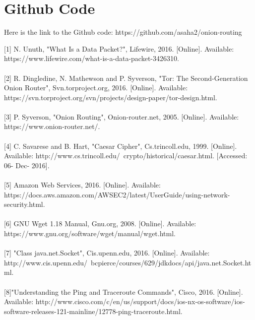 \documentclass{article}
\begin{document}
\section{Github Code}
Here is the link to the Github code:
https://github.com/asaha2/onion-routing

\newpage
\begin{thebibliography}{9}
%
%
[1] N. Unuth, "What Is a Data Packet?", Lifewire, 2016. [Online]. Available: https://www.lifewire.com/what-is-a-data-packet-3426310.\\
 \\

[2] R. Dingledine, N. Mathewson and P. Syverson, "Tor: The Second-Generation Onion Router", Svn.torproject.org, 2016. [Online]. Available: https://svn.torproject.org/svn/projects/design-paper/tor-design.html.\\
 \\

[3] P. Syverson, "Onion Routing", Onion-router.net, 2005. [Online]. Available: https://www.onion-router.net/.\\
 \\
 
[4] C. Savarese and B. Hart, "Caesar Cipher", Cs.trincoll.edu, 1999. [Online]. Available: http://www.cs.trincoll.edu/~crypto/historical/caesar.html. [Accessed: 06- Dec- 2016].\\
 \\
 
[5] Amazon Web Services, 2016. [Online]. Available:\\ https://docs.aws.amazon.com/AWSEC2/latest/UserGuide/using-network-security.html.\\
 \\
 
[6] GNU Wget 1.18 Manual, Gnu.org, 2008. [Online]. Available: https://www.gnu.org/software/wget/manual/wget.html. \\
 \\
 
[7] "Class java.net.Socket", Cis.upenn.edu, 2016. [Online]. Available: http://www.cis.upenn.edu/~bcpierce/courses/629/jdkdocs/api/java.net.Socket.html.\\
 \\
 
[8]"Understanding the Ping and Traceroute Commands", Cisco, 2016. [Online]. Available: http://www.cisco.com/c/en/us/support/docs/ios-nx-os-software/ios-software-releases-121-mainline/12778-ping-traceroute.html. 

\end{thebibliography}
\end{document}
